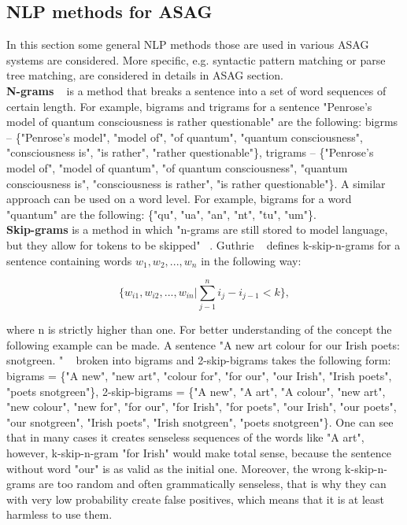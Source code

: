\subsection{NLP methods for ASAG}

In this section some general NLP methods those are used in various ASAG systems are considered. More specific, e.g. syntactic pattern matching or parse tree matching, are considered in details in ASAG section.\\

\textbf{N-grams} ~\cite{n-gram} is a method that breaks a sentence into a set of word sequences of certain length. For example, bigrams and trigrams for a sentence "Penrose's model of quantum consciousness is rather questionable" are the following: bigrms -- \{"Penrose's model", "model of", "of quantum", "quantum consciousness", "consciousness is", "is rather", "rather questionable"\}, trigrams -- \{"Penrose's model of", "model of quantum", "of quantum consciousness", "quantum consciousness is", "consciousness is rather", "is rather questionable"\}. A similar approach can be used on a word level. For example, bigrams for a word "quantum" are the following: \{"qu", "ua", "an", "nt", "tu", "um"\}.\\

\textbf{Skip-grams} is a method in which "n-grams are still stored to model language, but they allow for tokens to be skipped" ~\cite{Skip-gram}. Guthrie  ~\cite{Skip-gram} defines k-skip-n-grams for a sentence containing words $w_1,w_2,...,w_n$ in the following way:

\begin{equation} \label{eq:kskip}
\{w_{i1},w_{i2},...,w_{in} | \sum_{j-1}^n i_j - i_{j-1} < k\}, 
\end{equation}

where n is strictly higher than one. For better understanding of the concept the following example can be made. A sentence "A new art colour for our Irish poets: snotgreen. " ~\cite{Ulysses} broken into bigrams and 2-skip-bigrams takes the following form: bigrams = \{"A new", "new art", "colour for", "for our", "our Irish", "Irish poets", "poets snotgreen"\}, 2-skip-bigrams = \{"A new", "A art", "A colour", "new art", "new colour", "new for", "for our", "for Irish", "for poets", "our Irish", "our poets", "our snotgreen", "Irish poets", "Irish snotgreen",  "poets snotgreen"\}. One can see that in many cases it creates senseless sequences of the words like "A art", however, k-skip-n-gram "for Irish" would make total sense, because the sentence without word "our" is as valid as the initial one. Moreover, the wrong k-skip-n-grams are too random and often grammatically senseless, that is why they can with very low probability create false positives, which means that it is at least harmless to use them.\\

